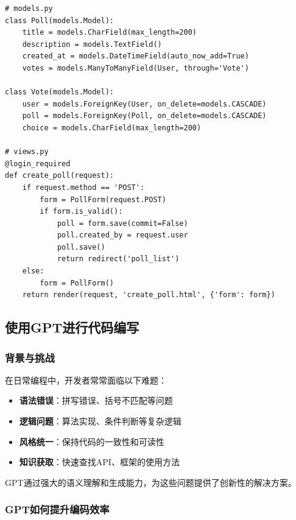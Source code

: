 \begin{enumerate}
\begin{itemize}
\begin{lstlisting}
# models.py
class Poll(models.Model):
    title = models.CharField(max_length=200)
    description = models.TextField()
    created_at = models.DateTimeField(auto_now_add=True)
    votes = models.ManyToManyField(User, through='Vote')

class Vote(models.Model):
    user = models.ForeignKey(User, on_delete=models.CASCADE)
    poll = models.ForeignKey(Poll, on_delete=models.CASCADE)
    choice = models.CharField(max_length=200)

# views.py
@login_required
def create_poll(request):
    if request.method == 'POST':
        form = PollForm(request.POST)
        if form.is_valid():
            poll = form.save(commit=False)
            poll.created_by = request.user
            poll.save()
            return redirect('poll_list')
    else:
        form = PollForm()
    return render(request, 'create_poll.html', {'form': form})
\end{lstlisting}
  \end{itemize}
\end{enumerate}

\hypertarget{ux4f7fux7528gptux8fdbux884cux4ee3ux7801ux7f16ux5199}{%
\subsection{使用GPT进行代码编写}\label{ux4f7fux7528gptux8fdbux884cux4ee3ux7801ux7f16ux5199}}

\hypertarget{ux80ccux666fux4e0eux6311ux6218-1}{%
\subsubsection{背景与挑战}\label{ux80ccux666fux4e0eux6311ux6218-1}}

在日常编程中，开发者常常面临以下难题：

\begin{itemize}
\item
  \textbf{语法错误}：拼写错误、括号不匹配等问题
\item
  \textbf{逻辑问题}：算法实现、条件判断等复杂逻辑
\item
  \textbf{风格统一}：保持代码的一致性和可读性
\item
  \textbf{知识获取}：快速查找API、框架的使用方法
\end{itemize}

GPT通过强大的语义理解和生成能力，为这些问题提供了创新性的解决方案。

\hypertarget{gptux5982ux4f55ux63d0ux5347ux7f16ux7801ux6548ux7387}{%
\subsubsection{GPT如何提升编码效率}\label{gptux5982ux4f55ux63d0ux5347ux7f16ux7801ux6548ux7387}}

